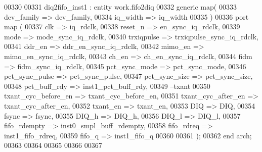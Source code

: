\begin{DoxyCode}
00330 
00331 diq2fifo\_inst1 : \textcolor{keywordflow}{entity} work.fifo2diq
00332    \textcolor{keywordflow}{generic} \textcolor{keywordflow}{map}( 
00333       dev_family     => dev_family,
00334       iq_width       => iq_width
00335    \textcolor{vhdlchar}{)}
00336    \textcolor{keywordflow}{port} \textcolor{keywordflow}{map} (
00337       clk                  => iq_rdclk,
00338       reset_n              => en_sync_iq_rdclk,
00339       mode                 => mode_sync_iq_rdclk,
00340       trxiqpulse           => trxiqpulse_sync_iq_rdclk,
00341       ddr_en               => ddr_en_sync_iq_rdclk,
00342       mimo_en              => mimo_en_sync_iq_rdclk,
00343       ch_en                => ch_en_sync_iq_rdclk,
00344       fidm                 => fidm_sync_iq_rdclk,
00345       pct_sync_mode        => pct_sync_mode,      
00346       pct_sync_pulse       => pct_sync_pulse,
00347       pct_sync_size        => pct_sync_size,
00348       pct_buff_rdy         => inst1_pct_buff_rdy,
00349 \textcolor{keyword}{      --txant              }
00350       txant_cyc_before_en  => txant_cyc_before_en,
00351       txant_cyc_after_en   => txant_cyc_after_en,
00352       txant_en             => txant_en,
00353       DIQ                  => DIQ,
00354       fsync                => fsync,
00355       DIQ_h                => DIQ_h,
00356       DIQ_l                => DIQ_l,
00357       fifo_rdempty         => inst0_smpl_buff_rdempty,
00358       fifo_rdreq           => inst1_fifo_rdreq,
00359       fifo_q               => inst1_fifo_q 
00360    
00361       \textcolor{vhdlchar}{)};
00362 \textcolor{keywordflow}{end} \textcolor{vhdlchar}{arch};   
00363 
00364 
00365 
00366 
00367 
\end{DoxyCode}
